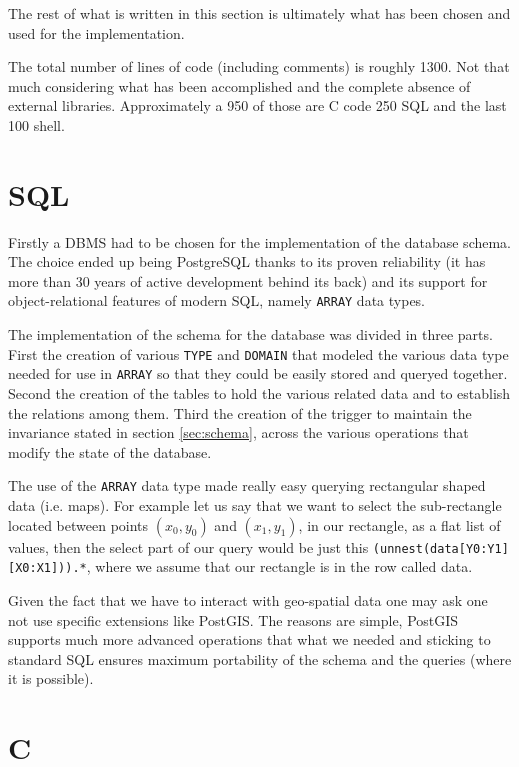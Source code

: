 \documentclass[Lau]{sapthesis} %
\let\oldsection\section
\def\subsection{\oldsection}
\def\section{\chapter}
\begin{document}
The rest of what is written in this section is ultimately what has been chosen
and used for the implementation.

The total number of lines of code (including comments) is roughly 1300. Not that
much considering what has been accomplished and the complete absence of external
libraries. Approximately a 950 of those are C code 250 SQL and the last 100
shell.

\subsection{SQL}

Firstly a DBMS had to be chosen for the implementation of the database schema.
The choice ended up being PostgreSQL thanks to its proven reliability (it has
more than 30 years of active development behind its back) and its support for
object-relational features of modern SQL, namely \texttt{ARRAY} data types.

The implementation of the schema for the database was divided in three parts.
First the creation of various \texttt{TYPE} and \texttt{DOMAIN} that modeled
the various data type needed for use in \texttt{ARRAY} so that they could be
easily stored and queryed together. Second the creation of the tables to hold the
various related data and to establish the relations among them. Third the
creation of the trigger to maintain the invariance stated in section
\ref{sec:schema}, across the various operations that modify the state of the
database.

The use of the \texttt{ARRAY} data type made really easy querying rectangular
shaped data (i.e. maps). For example let us say that we want to select the
sub-rectangle located between points $(x_0,y_0)$ and $(x_1,y_1)$, in our
rectangle, as a flat list of values, then the select part of our query would be
just this \texttt{(unnest(data[Y0:Y1][X0:X1])).*}, where we assume that our
rectangle is in the row called data.

Given the fact that we have to interact with geo-spatial data one may ask one
not use specific extensions like PostGIS. The reasons are simple, PostGIS
supports much more advanced operations that what we needed and sticking to
standard SQL ensures maximum portability of the schema and the queries (where
it is possible).

\subsection{C}
\end{document}
